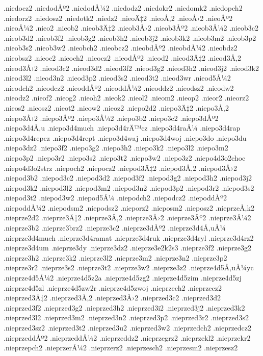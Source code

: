 {.niedocz2
.niedodÅº2
.niedodÅ¼2
.niedodz2
.niedokr2
.niedomk2
.niedopch2
.niedorz2
.niedosz2
.niedotk2
.niedz2
.nieoÄ‡2
.nieoÅ‚2
.nieoÅ›2
.nieoÅº2
.nieoÅ¼2
.nieo2
.nieob2
.nieob3Ä‡2
.nieob3Å›2
.nieob3Åº2
.nieob3Å¼2
.nieob3c2
.nieob3d2
.nieob3f2
.nieob3g2
.nieob3h2
.nieob3j2
.nieob3k2
.nieob3m2
.nieob3p2
.nieob3s2
.nieob3w2
.nieobch2
.nieobcz2
.nieobdÅº2
.nieobdÅ¼2
.nieobdz2
.nieobsz2
.nieoc2
.nieoch2
.nieocz2
.nieodÅº2
.nieod2
.nieod3Ä‡2
.nieod3Å‚2
.nieod3Å›2
.nieod3c2
.nieod3d2
.nieod3f2
.nieod3g2
.nieod3h2
.nieod3j2
.nieod3k2
.nieod3l2
.nieod3n2
.nieod3p2
.nieod3s2
.nieod3t2
.nieod3wr
.nieod5Å¼2
.nieodch2
.nieodcz2
.nieoddÅº2
.nieoddÅ¼2
.nieoddz2
.nieodsz2
.nieodw2
.nieodz2
.nieof2
.nieog2
.nieoh2
.nieok2
.nieol2
.nieom2
.nieop2
.nieor2
.nieorz2
.nieos2
.nieosz2
.nieot2
.nieow2
.nieoz2
.niepo2d2
.niepo3Ä‡2
.niepo3Å‚2
.niepo3Å›2
.niepo3Åº2
.niepo3Å¼2
.niepo3b2
.niepo3c2
.niepo3dÅº2
.niepo3d4Å‚u
.niepo3d4much
.niepo3d4rÄ™cz
.niepo3d4raÅ¼
.niepo3d4rap
.niepo3d4repcz
.niepo3d4rept
.niepo3d4waj
.niepo3d4woj
.niepo3do
.niepo3du
.niepo3dz2
.niepo3f2
.niepo3g2
.niepo3h2
.niepo3k2
.niepo3l2
.niepo3m2
.niepo3p2
.niepo3r2
.niepo3s2
.niepo3t2
.niepo3w2
.niepo3z2
.niepo4d3o2choc
.niepo4d3o2strz
.niepoch2
.niepocz2
.niepod3Ä‡2
.niepod3Å‚2
.niepod3Å›2
.niepod3b2
.niepod3c2
.niepod3d2
.niepod3f2
.niepod3g2
.niepod3h2
.niepod3j2
.niepod3k2
.niepod3l2
.niepod3m2
.niepod3n2
.niepod3p2
.niepod3r2
.niepod3s2
.niepod3t2
.niepod3w2
.niepod5Å¼
.niepodch2
.niepodcz2
.niepoddÅº2
.niepoddÅ¼2
.niepodsm2
.niepodsz2
.nieporz2
.nieposm2
.nieposz2
.nieprzeÅ‚k2
.nieprze2d2
.nieprze3Ä‡2
.nieprze3Å‚2
.nieprze3Å›2
.nieprze3Åº2
.nieprze3Å¼2
.nieprze3b2
.nieprze3brz2
.nieprze3c2
.nieprze3dÅº2
.nieprze3d4Å‚uÅ¼
.nieprze3d4much
.nieprze3d4ramat
.nieprze3d4ruk
.nieprze3d4ryl
.nieprze3d4rz2
.nieprze3d4um
.nieprze3dy
.nieprze3dz2
.nieprze3e2k2s3
.nieprze3f2
.nieprze3g2
.nieprze3h2
.nieprze3k2
.nieprze3l2
.nieprze3m2
.nieprze3n2
.nieprze3p2
.nieprze3r2
.nieprze3s2
.nieprze3t2
.nieprze3w2
.nieprze3z2
.nieprze4d5Å‚uÅ¼yc
.nieprze4d5Å¼2
.nieprze4d5z2a
.nieprze4d5zg2
.nieprze4d5zim
.nieprze4d5zj
.nieprze4d5zl
.nieprze4d5zw2r
.nieprze4d5zwoj
.nieprzech2
.nieprzecz2
.nieprzed3Ä‡2
.nieprzed3Å‚2
.nieprzed3Å›2
.nieprzed3c2
.nieprzed3d2
.nieprzed3f2
.nieprzed3g2
.nieprzed3h2
.nieprzed3i2
.nieprzed3j2
.nieprzed3k2
.nieprzed3l2
.nieprzed3m2
.nieprzed3n2
.nieprzed3p2
.nieprzed3r2
.nieprzed3s2
.nieprzed3sz2
.nieprzed3t2
.nieprzed3u2
.nieprzed3w2
.nieprzedch2
.nieprzedcz2
.nieprzeddÅº2
.nieprzeddÅ¼2
.nieprzeddz2
.nieprzegrz2
.nieprzekl2
.nieprzekr2
.nieprzepch2
.nieprzerÅ¼2
.nieprzerz2
.nieprzesch2
.nieprzesm2
.nieprzesz2
}

